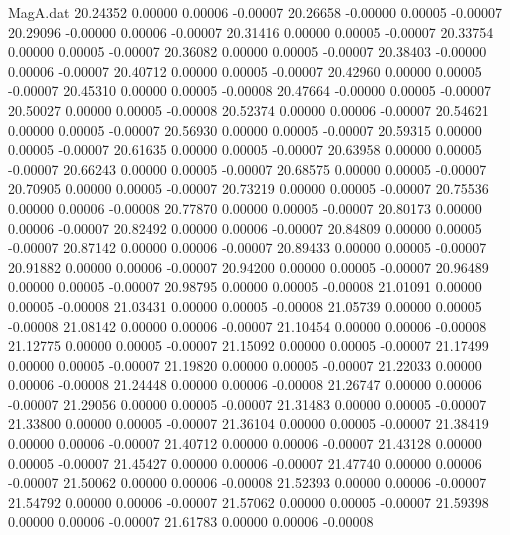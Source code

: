 \begin{filecontents}{MagA.dat}
  20.24352    0.00000    0.00006   -0.00007
  20.26658   -0.00000    0.00005   -0.00007
  20.29096   -0.00000    0.00006   -0.00007
  20.31416    0.00000    0.00005   -0.00007
  20.33754    0.00000    0.00005   -0.00007
  20.36082    0.00000    0.00005   -0.00007
  20.38403   -0.00000    0.00006   -0.00007
  20.40712    0.00000    0.00005   -0.00007
  20.42960    0.00000    0.00005   -0.00007
  20.45310    0.00000    0.00005   -0.00008
  20.47664   -0.00000    0.00005   -0.00007
  20.50027    0.00000    0.00005   -0.00008
  20.52374    0.00000    0.00006   -0.00007
  20.54621    0.00000    0.00005   -0.00007
  20.56930    0.00000    0.00005   -0.00007
  20.59315    0.00000    0.00005   -0.00007
  20.61635    0.00000    0.00005   -0.00007
  20.63958    0.00000    0.00005   -0.00007
  20.66243    0.00000    0.00005   -0.00007
  20.68575    0.00000    0.00005   -0.00007
  20.70905    0.00000    0.00005   -0.00007
  20.73219    0.00000    0.00005   -0.00007
  20.75536    0.00000    0.00006   -0.00008
  20.77870    0.00000    0.00005   -0.00007
  20.80173    0.00000    0.00006   -0.00007
  20.82492    0.00000    0.00006   -0.00007
  20.84809    0.00000    0.00005   -0.00007
  20.87142    0.00000    0.00006   -0.00007
  20.89433    0.00000    0.00005   -0.00007
  20.91882    0.00000    0.00006   -0.00007
  20.94200    0.00000    0.00005   -0.00007
  20.96489    0.00000    0.00005   -0.00007
  20.98795    0.00000    0.00005   -0.00008
  21.01091    0.00000    0.00005   -0.00008
  21.03431    0.00000    0.00005   -0.00008
  21.05739    0.00000    0.00005   -0.00008
  21.08142    0.00000    0.00006   -0.00007
  21.10454    0.00000    0.00006   -0.00008
  21.12775    0.00000    0.00005   -0.00007
  21.15092    0.00000    0.00005   -0.00007
  21.17499    0.00000    0.00005   -0.00007
  21.19820    0.00000    0.00005   -0.00007
  21.22033    0.00000    0.00006   -0.00008
  21.24448    0.00000    0.00006   -0.00008
  21.26747    0.00000    0.00006   -0.00007
  21.29056    0.00000    0.00005   -0.00007
  21.31483    0.00000    0.00005   -0.00007
  21.33800    0.00000    0.00005   -0.00007
  21.36104    0.00000    0.00005   -0.00007
  21.38419    0.00000    0.00006   -0.00007
  21.40712    0.00000    0.00006   -0.00007
  21.43128    0.00000    0.00005   -0.00007
  21.45427    0.00000    0.00006   -0.00007
  21.47740    0.00000    0.00006   -0.00007
  21.50062    0.00000    0.00006   -0.00008
  21.52393    0.00000    0.00006   -0.00007
  21.54792    0.00000    0.00006   -0.00007
  21.57062    0.00000    0.00005   -0.00007
  21.59398    0.00000    0.00006   -0.00007
  21.61783    0.00000    0.00006   -0.00008

\end{filecontents}
